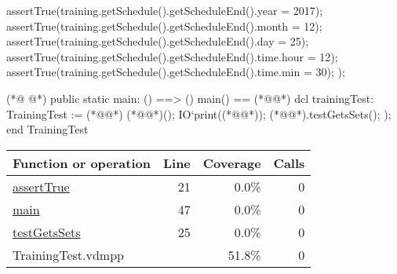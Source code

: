 \begin{vdmpp}[breaklines=true]
   assertTrue(training.getSchedule().getScheduleEnd().year = 2017);
   assertTrue(training.getSchedule().getScheduleEnd().month = 12);
   assertTrue(training.getSchedule().getScheduleEnd().day = 25);
   assertTrue(training.getSchedule().getScheduleEnd().time.hour = 12);
   assertTrue(training.getSchedule().getScheduleEnd().time.min = 30);
  );

(*@
\label{main:47}
@*)
 public static main: () ==> ()
   main() == (*@\vdmnotcovered{(}@*)
    dcl trainingTest: TrainingTest := (*@@*) (*@@*)();
    IO`print((*@@*));
    (*@@*).testGetsSets();
   );
end TrainingTest
\end{vdmpp}
\bigskip
\begin{longtable}{|l|r|r|r|}
\hline
Function or operation & Line & Coverage & Calls \\
\hline
\hline
\hyperref[assertTrue:21]{assertTrue} & 21&0.0\% & 0 \\
\hline
\hyperref[main:47]{main} & 47&0.0\% & 0 \\
\hline
\hyperref[testGetsSets:25]{testGetsSets} & 25&0.0\% & 0 \\
\hline
\hline
TrainingTest.vdmpp & & 51.8\% & 0 \\
\hline
\end{longtable}

